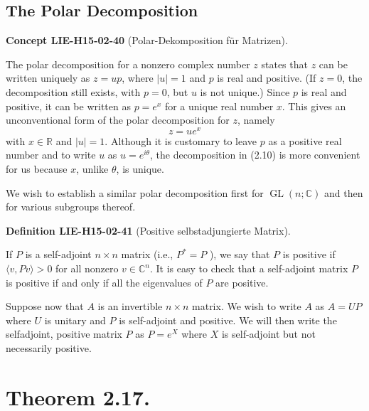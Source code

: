 \documentclass[10pt, letterpaper]{article}
\newcommand{\CustomHeading}[3]{%
  \par\medskip\noindent%
  \textbf{#1 #2} \textnormal{(#3)}.\enskip%
}
\newenvironment{DEF}[2]{\begin{unitbox}\CustomHeading{Definition}{#1}{#2}}{\end{unitbox}}
\newenvironment{CONC}[2]{\begin{unitbox}\CustomHeading{Concept}{#1}{#2}}{\end{unitbox}}
\begin{document}
\subsection*{The Polar Decomposition}


\begin{CONC}{LIE-H15-02-40}{Polar-Dekomposition für Matrizen}
The polar decomposition for a nonzero complex number $z$ states that $z$ can be written uniquely as $z=u p$, where $|u|=1$ and $p$ is real and positive. (If $z=0$, the decomposition still exists, with $p=0$, but $u$ is not unique.) Since $p$ is real and positive, it can be written as $p=e^{x}$ for a unique real number $x$. This gives an unconventional form of the polar decomposition for $z$, namely
$$
z=u e^{x}
$$
with $x \in \mathbb{R}$ and $|u|=1$. Although it is customary to leave $p$ as a positive real number and to write $u$ as $u=e^{i \theta}$, the decomposition in (2.10) is more convenient for us because $x$, unlike $\theta$, is unique.

We wish to establish a similar polar decomposition first for $\operatorname{GL}(n ; \mathbb{C})$ and then for various subgroups thereof.
\end{CONC}

\begin{DEF}{LIE-H15-02-41}{Positive selbstadjungierte Matrix}
If $P$ is a self-adjoint $n \times n$ matrix (i.e., $P^{*}=P$ ), we say that $P$ is positive if $\langle v, P v\rangle>0$ for all nonzero $v \in \mathbb{C}^{n}$. It is easy to check that a self-adjoint matrix $P$ is positive if and only if all the eigenvalues of $P$ are positive.
\end{DEF}


Suppose now that $A$ is an invertible $n \times n$ matrix. We wish to write $A$ as $A=U P$ where $U$ is unitary and $P$ is self-adjoint and positive. We will then write the selfadjoint, positive matrix $P$ as $P=e^{X}$ where $X$ is self-adjoint but not necessarily positive.

\section*{Theorem 2.17.}
\end{document}
